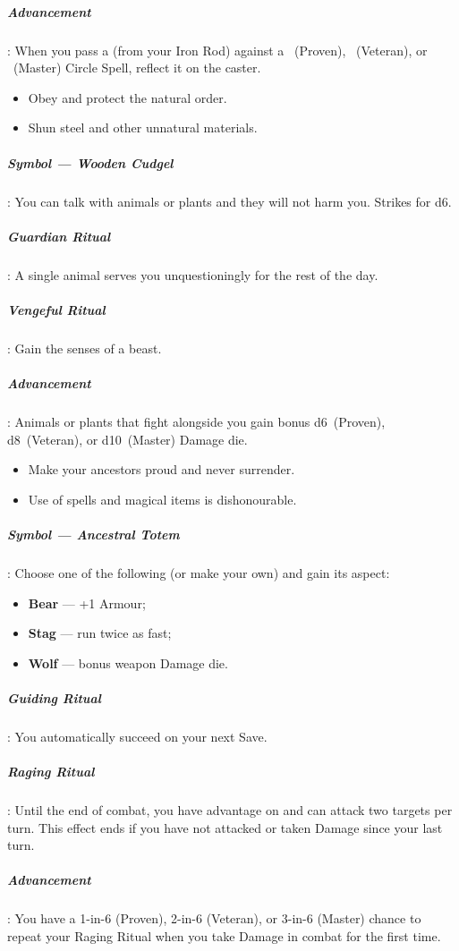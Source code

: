 \documentclass[itdr]{subfiles}
\begin{document}
\subparagraph{Advancement}: When you pass a  (from your Iron Rod) against a ~(Proven), ~(Veteran), or ~(Master) Circle Spell, reflect it on the caster.

\vfill

{\em\begin{itemize}
		\item Obey and protect the natural order.
		\item Shun steel and other unnatural materials.
\end{itemize}}

\subparagraph{Symbol --- Wooden Cudgel}: You can talk with animals or plants and they will not harm you. Strikes for d6.

\subparagraph{Guardian Ritual}: A single animal serves you unquestioningly for the rest of the day.

\subparagraph{Vengeful Ritual}: Gain the senses of a beast.

\subparagraph{Advancement}: Animals or plants that fight alongside you gain bonus d6~(Proven), d8~(Veteran), or d10~(Master) Damage die.

\vfill

{\em\begin{itemize}
		\item Make your ancestors proud and never surrender.
		\item Use of spells and magical items is dishonourable.
\end{itemize}}

\subparagraph{Symbol --- Ancestral Totem}: Choose one of the following (or make your own) and gain its aspect:
\vspace{-0.3em}\begin{itemize}
	\item \textbf{Bear} --- +1 Armour;
	\item \textbf{Stag} --- run twice as fast;
	\item \textbf{Wolf} --- bonus weapon Damage die.
\end{itemize}
\vspace{-0.3em}
\subparagraph{Guiding Ritual}: You automatically succeed on your next Save.

\subparagraph{Raging Ritual}: Until the end of combat, you have advantage on  and can attack two targets per turn. This effect ends if you have not attacked or taken Damage since your last turn.

\subparagraph{Advancement}: You have a 1-in-6 (Proven), 2-in-6 (Veteran), or 3-in-6 (Master) chance to repeat your Raging Ritual when you take Damage in combat for the first time.
\end{document}
